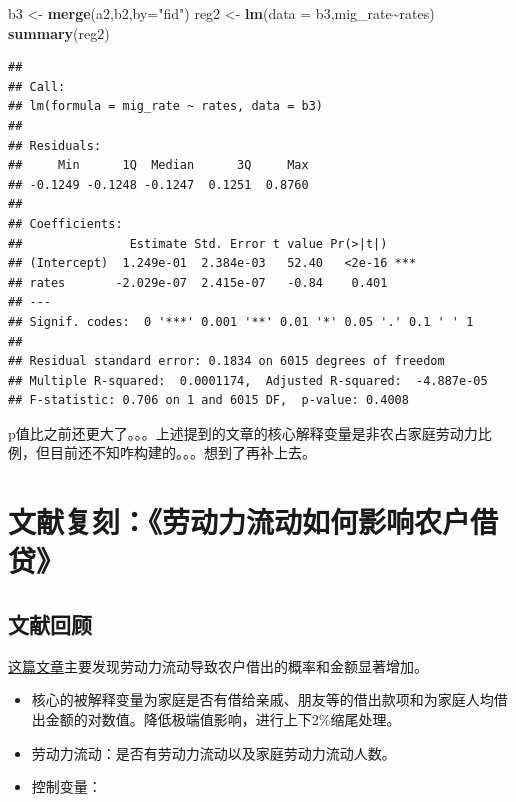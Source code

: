 \documentclass[
]{book}
\newenvironment{Shaded}{\begin{snugshade}}{\end{snugshade}}
\newcommand{\AttributeTok}[1]{\textcolor[rgb]{0.13,0.29,0.53}{#1}}
\newcommand{\FunctionTok}[1]{\textcolor[rgb]{0.13,0.29,0.53}{\textbf{#1}}}
\newcommand{\NormalTok}[1]{#1}
\newcommand{\OtherTok}[1]{\textcolor[rgb]{0.56,0.35,0.01}{#1}}
\newcommand{\SpecialCharTok}[1]{\textcolor[rgb]{0.81,0.36,0.00}{\textbf{#1}}}
\newcommand{\StringTok}[1]{\textcolor[rgb]{0.31,0.60,0.02}{#1}}
\begin{document}
\begin{Shaded}
\begin{Highlighting}[]
\NormalTok{b3 }\OtherTok{\textless{}{-}} \FunctionTok{merge}\NormalTok{(a2,b2,}\AttributeTok{by=}\StringTok{"fid"}\NormalTok{)}
\NormalTok{reg2 }\OtherTok{\textless{}{-}} \FunctionTok{lm}\NormalTok{(}\AttributeTok{data =}\NormalTok{ b3,mig\_rate}\SpecialCharTok{\textasciitilde{}}\NormalTok{rates)}
\FunctionTok{summary}\NormalTok{(reg2)}
\end{Highlighting}
\end{Shaded}

\begin{verbatim}
## 
## Call:
## lm(formula = mig_rate ~ rates, data = b3)
## 
## Residuals:
##     Min      1Q  Median      3Q     Max 
## -0.1249 -0.1248 -0.1247  0.1251  0.8760 
## 
## Coefficients:
##               Estimate Std. Error t value Pr(>|t|)    
## (Intercept)  1.249e-01  2.384e-03   52.40   <2e-16 ***
## rates       -2.029e-07  2.415e-07   -0.84    0.401    
## ---
## Signif. codes:  0 '***' 0.001 '**' 0.01 '*' 0.05 '.' 0.1 ' ' 1
## 
## Residual standard error: 0.1834 on 6015 degrees of freedom
## Multiple R-squared:  0.0001174,  Adjusted R-squared:  -4.887e-05 
## F-statistic: 0.706 on 1 and 6015 DF,  p-value: 0.4008
\end{verbatim}

p值比之前还更大了。。。上述提到的文章的核心解释变量是非农占家庭劳动力比例，但目前还不知咋构建的。。。想到了再补上去。

\hypertarget{ux6587ux732eux590dux523bux52b3ux52a8ux529bux6d41ux52a8ux5982ux4f55ux5f71ux54cdux519cux6237ux501fux8d37}{%
\chapter{文献复刻：《劳动力流动如何影响农户借贷》}\label{ux6587ux732eux590dux523bux52b3ux52a8ux529bux6d41ux52a8ux5982ux4f55ux5f71ux54cdux519cux6237ux501fux8d37}}

\hypertarget{ux6587ux732eux56deux987e}{%
\section{文献回顾}\label{ux6587ux732eux56deux987e}}

\href{https://www.cnki.com.cn/Article/CJFDTOTAL-SJJJ202112006.htm}{这篇文章}主要发现劳动力流动导致农户借出的概率和金额显著增加。

\begin{itemize}
\item
  核心的被解释变量为家庭是否有借给亲戚、朋友等的借出款项和为家庭人均借出金额的对数值。降低极端值影响，进行上下2\%缩尾处理。
\item
  劳动力流动：是否有劳动力流动以及家庭劳动力流动人数。
\item
  控制变量：
\end{itemize}
\end{document}
